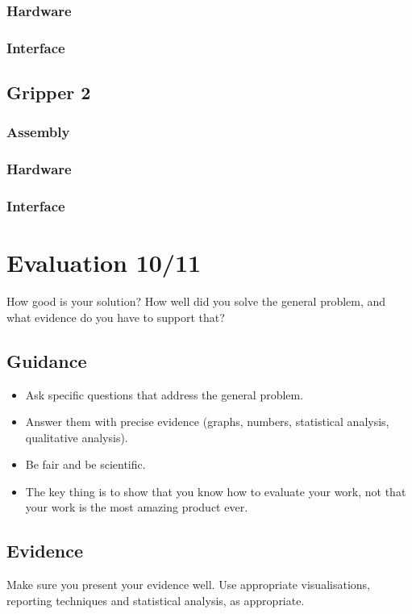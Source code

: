 \documentclass{l4proj}
\begin{document}
\subsection{Hardware}
\subsection{Interface}

\section{Gripper 2}
\subsection{Assembly}
\subsection{Hardware}
\subsection{Interface}


\chapter{Evaluation 10/11} 
How good is your solution? How well did you solve the general problem, and what evidence do you have to support that?

\section{Guidance}
\begin{itemize}
    \item
        Ask specific questions that address the general problem.
    \item
        Answer them with precise evidence (graphs, numbers, statistical
        analysis, qualitative analysis).
    \item
        Be fair and be scientific.
    \item
        The key thing is to show that you know how to evaluate your work, not
        that your work is the most amazing product ever.
\end{itemize}

\section{Evidence}
Make sure you present your evidence well. Use appropriate visualisations, reporting techniques and statistical analysis, as appropriate.
\end{document}
